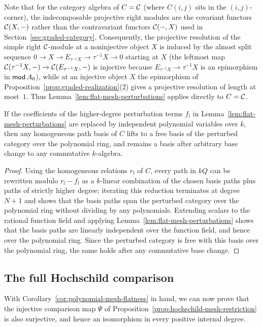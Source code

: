 Note that for the category algebra of $C=\mathcal C$ (where $C(i,j)$ sits in the $(i,j)$-corner), the indecomposable projective right modules are the covariant functors $\mathcal C(X,-)$ rather than the contravariant functors $\mathcal C(-,X)$ used in Section~\ref{sec:graded-category}. Consequently, the projective resolution of the simple right $\mathcal C$-module at a noninjective object $X$ is induced by the almost split sequence $0\to X\to E_{\tau^{-1}X}\to\tau^{-1}X\to0$ starting at $X$ (the leftmost map $\mathcal C(\tau^{-1}X,-)\to\mathcal C(E_{\tau^{-1}X},-)$ is injective because $E_{\tau^{-1}X}\to\tau^{-1}X$ is an epimorphism in $\operatorname{\mathsf{mod}} A_0$), while at an injective object $X$ the epimorphism of Proposition~\ref{prop:graded-realization}(2) gives a projective resolution of length at most~$1$. Thus Lemma~\ref{lem:flat-mesh-perturbations} applies directly to $C=\mathcal C$.

\begin{corollary}
\label{cor:polynomial-mesh-flatness}
If the coefficients of the higher-degree perturbation terms $f_l$ in Lemma~\ref{lem:flat-mesh-perturbations} are replaced by independent polynomial variables over $k$, then any homogeneous path basis of $C$ lifts to a free basis of the perturbed category over the polynomial ring, and remains a basis after arbitrary base change to any commutative $k$-algebra.
\end{corollary}
\begin{proof}
Using the homogeneous relations $r_l$ of $C$, every path in $kQ$ can be rewritten modulo $r_l-f_l$ as a $k$-linear combination of the chosen basis paths plus paths of strictly higher degree; iterating this reduction terminates at degree $N+1$ and shows that the basis paths span the perturbed category over the polynomial ring without dividing by any polynomials. Extending scalars to the rational function field and applying Lemma~\ref{lem:flat-mesh-perturbations} shows that the basis paths are linearly independent over the function field, and hence over the polynomial ring. Since the perturbed category is free with this basis over the polynomial ring, the same holds after any commutative base change.
\end{proof}

\subsection{The full Hochschild comparison}

With Corollary~\ref{cor:polynomial-mesh-flatness} in hand, we can now prove that the injective comparison map $\Psi$ of Proposition~\ref{prop:hochschild-mesh-restriction} is also surjective, and hence an isomorphism in every positive internal degree.

